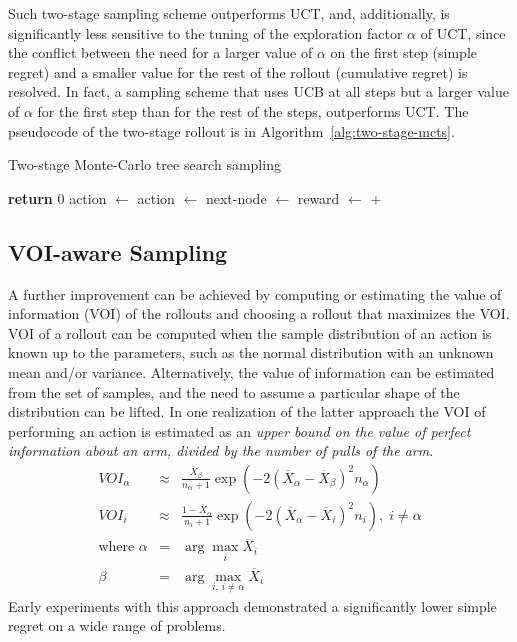 \documentclass[letterpaper]{article}
\begin{document}
Such two-stage sampling scheme outperforms UCT, and, additionally, is
significantly less sensitive to the tuning of the exploration factor
$\alpha$ of UCT, since the conflict between the need for a larger
value of $\alpha$ on the first step (simple regret) and a smaller
value for the rest of the rollout (cumulative regret)
\cite{Bubeck.pure} is resolved. In fact, a sampling scheme that uses
UCB at all steps but a larger value of $\alpha$ for the first step
than for the rest of the steps, outperforms UCT. The pseudocode of the
two-stage rollout is in Algorithm~\ref{alg:two-stage-mcts}.

\begin{algorithm}[t]
\caption{Two-stage Monte-Carlo tree search sampling}
\label{alg:two-stage-mcts}
\begin{algorithmic}[1]
    \State \textbf{return} 0
  \Else
      \State action $\gets$ 
    \Else
      \State action $\gets$ 
    \EndIf
    \State next-node $\gets$ 
    \State reward $\gets$ 
     \State \hspace{4em} + 
    \State {}
  \EndIf
\EndProcedure
\end{algorithmic}
\end{algorithm}

\subsection{VOI-aware Sampling}
\label{sec:voi-sampling}

A further improvement can be achieved by computing or estimating the
value of information (VOI) of the rollouts and choosing a rollout that
maximizes the VOI. VOI of a rollout can be computed when the sample
distribution of an action is known up to the parameters, such as the
normal distribution with an unknown mean and/or
variance. Alternatively, the value of information can be estimated
from the set of samples, and the need to assume a particular shape of
the distribution can be lifted. In one realization of the latter
approach the VOI of performing an action is estimated as an
\emph{upper bound on the value of perfect information about an arm,
divided by the number of pulls of the arm}.
\begin{eqnarray}
VOI_\alpha&\approx&\frac {\overline X_\beta} {n_\alpha+1}
\exp\left(-2(\overline X_\alpha - \overline X_\beta)^2 n_\alpha\right)\\
VOI_i&\approx&\frac {1-\overline X_\alpha} {n_i+1}
\exp\left(-2(\overline X_\alpha - \overline X_i)^2 n_i\right),\; i\ne\alpha\nonumber\\
\mbox{where }\alpha&=&\arg\max_i \overline X_i\nonumber\\
             \beta&=&\arg\max_{i,\,i\ne\alpha} \overline X_i\nonumber
\end{eqnarray}
Early experiments with this approach demonstrated
a significantly lower simple regret on a wide range of problems.
\end{document}
